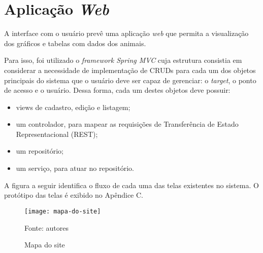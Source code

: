 \section{Aplicação \emph{Web}}

A interface com o usuário prevê uma aplicação \emph{web} que permita a visualização dos gráficos e tabelas com dados dos animais.

Para isso, foi utilizado o \emph{framework Spring MVC} cuja estrutura consistia em considerar a necessidade de implementação de CRUDs para cada um dos objetos principais do sistema que o usuário deve ser capaz de gerenciar: o \emph{target}, o ponto de acesso e o usuário. Dessa forma, cada um destes objetos deve possuir:

\begin{itemize}
	\item views de cadastro, edição e listagem;
	\item um controlador, para mapear as requisições de Transferência de Estado Representacional (REST);
	\item um repositório;
	\item um serviço, para atuar no repositório.
\end{itemize}

A figura a seguir identifica o fluxo de cada uma das telas existentes no sistema. O protótipo das telas é exibido no Apêndice C.

\begin{figure}[ht]
  \centering
    \caption{Mapa do site}
    \texttt{[image: mapa-do-site]}
  \centerline{\small{Fonte: autores}}
\end{figure}
\FloatBarrier
